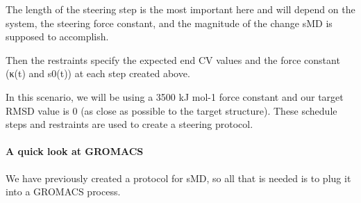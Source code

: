 The length of the steering step is the most important here and will
depend on the system, the steering force constant, and the magnitude of
the change sMD is supposed to accomplish.

Then the restraints specify the expected end CV values and the force
constant (κ(t) and s⃗0(t)) at each step created above.

\begin{Shaded}
\begin{Highlighting}[]
\OperatorTok{=}
\OperatorTok{=}\NormalTok{)}
\OperatorTok{=}\NormalTok{)}
\OperatorTok{=}\OperatorTok{*}\NormalTok{)}
\OperatorTok{=}\OperatorTok{*}\NormalTok{)}
\end{Highlighting}
\end{Shaded}

In this scenario, we will be using a 3500 kJ mol-1 force constant and
our target RMSD value is 0 (as close as possible to the target
structure). These schedule steps and restraints are used to create a
steering protocol.

\begin{Shaded}
\begin{Highlighting}[]
\OperatorTok{=}\OperatorTok{=}\OperatorTok{*}
\end{Highlighting}
\end{Shaded}

\hypertarget{a-quick-look-at-gromacs}{%
\paragraph{A quick look at GROMACS}\label{a-quick-look-at-gromacs}}

We have previously created a protocol for sMD, so all that is needed is
to plug it into a GROMACS process.

\begin{Shaded}
\begin{Highlighting}[]
\OperatorTok{=}
\end{Highlighting}
\end{Shaded}

